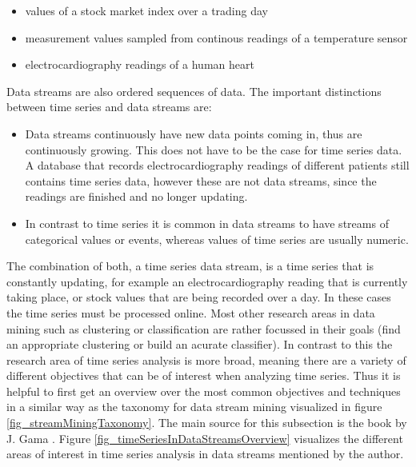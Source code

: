 \begin{itemize}
	\item values of a stock market index over a trading day
	\item measurement values sampled from continous readings of a temperature sensor
	\item electrocardiography readings of a human heart
\end{itemize}

Data streams are also ordered sequences of data. The important distinctions between time series and data streams are: 

\begin{itemize}
	\item Data streams continuously have new data points coming in, thus are continuously growing. This does not have to be the case for time series data. A database that records electrocardiography readings of different patients still contains time series data, however these are not data streams, since the readings are finished and no longer updating.
	\item In contrast to time series it is common in data streams to have streams of categorical values or events, whereas values of time series are usually numeric.
\end{itemize}

The combination of both, a time series data stream, is a time series that is constantly updating, for example an electrocardiography reading that is currently taking place, or stock values that are being recorded over a day. In these cases the time series must be processed online. \newline
Most other research areas in data mining such as clustering or classification are rather focussed in their goals (find an appropriate clustering or build an acurate classifier). In contrast to this the research area of time series analysis is more broad, meaning there are a variety of different objectives that can be of interest when analyzing time series. Thus it is helpful to first get an overview over the most common objectives and techniques in a similar way as the taxonomy for data stream mining visualized in figure \ref{fig_streamMiningTaxonomy}. The main source for this subsection is the book by J. Gama \cite{gama2010knowledge}. Figure \ref{fig_timeSeriesInDataStreamsOverview} visualizes the different areas of interest in time series analysis in data streams mentioned by the author.

